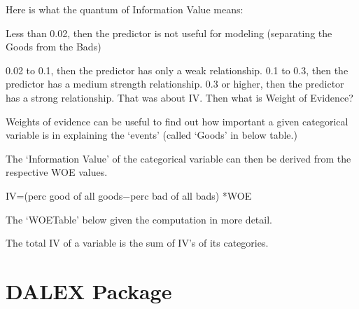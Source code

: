 \documentclass[]{book}
\newenvironment{Shaded}{\begin{snugshade}}{\end{snugshade}}
\newcommand{\CommentTok}[1]{\textcolor[rgb]{0.56,0.35,0.01}{\textit{#1}}}
\newcommand{\DataTypeTok}[1]{\textcolor[rgb]{0.13,0.29,0.53}{#1}}
\newcommand{\KeywordTok}[1]{\textcolor[rgb]{0.13,0.29,0.53}{\textbf{#1}}}
\newcommand{\NormalTok}[1]{#1}
\newcommand{\OperatorTok}[1]{\textcolor[rgb]{0.81,0.36,0.00}{\textbf{#1}}}
\newcommand{\StringTok}[1]{\textcolor[rgb]{0.31,0.60,0.02}{#1}}
\begin{document}
Here is what the quantum of Information Value means:

Less than 0.02, then the predictor is not useful for modeling (separating the Goods from the Bads)

0.02 to 0.1, then the predictor has only a weak relationship.
0.1 to 0.3, then the predictor has a medium strength relationship.
0.3 or higher, then the predictor has a strong relationship.
That was about IV. Then what is Weight of Evidence?

Weights of evidence can be useful to find out how important a given categorical variable is in explaining the `events' (called `Goods' in below table.)

The `Information Value' of the categorical variable can then be derived from the respective WOE values.

IV=(perc good of all goods−perc bad of all bads) *WOE

The `WOETable' below given the computation in more detail.

\begin{Shaded}
\end{Shaded}

The total IV of a variable is the sum of IV's of its categories.

\hypertarget{dalex-package}{%
\section{DALEX Package}\label{dalex-package}}
\end{document}
